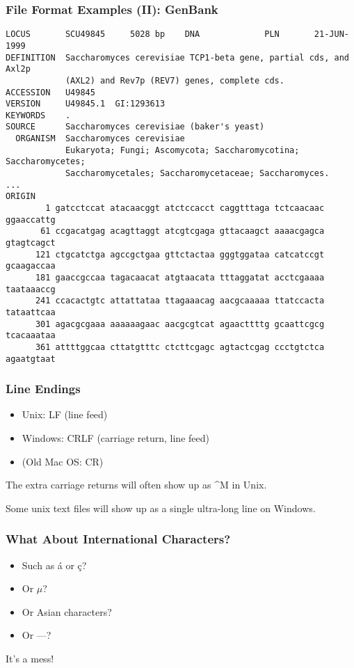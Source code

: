 \begin{frame}[fragile]
\frametitle{File Format Examples (II): GenBank}

\begin{verbatim}
LOCUS       SCU49845     5028 bp    DNA             PLN       21-JUN-1999
DEFINITION  Saccharomyces cerevisiae TCP1-beta gene, partial cds, and Axl2p
            (AXL2) and Rev7p (REV7) genes, complete cds.
ACCESSION   U49845
VERSION     U49845.1  GI:1293613
KEYWORDS    .
SOURCE      Saccharomyces cerevisiae (baker's yeast)
  ORGANISM  Saccharomyces cerevisiae
            Eukaryota; Fungi; Ascomycota; Saccharomycotina; Saccharomycetes;
            Saccharomycetales; Saccharomycetaceae; Saccharomyces.
...
ORIGIN
        1 gatcctccat atacaacggt atctccacct caggtttaga tctcaacaac ggaaccattg
       61 ccgacatgag acagttaggt atcgtcgaga gttacaagct aaaacgagca gtagtcagct
      121 ctgcatctga agccgctgaa gttctactaa gggtggataa catcatccgt gcaagaccaa
      181 gaaccgccaa tagacaacat atgtaacata tttaggatat acctcgaaaa taataaaccg
      241 ccacactgtc attattataa ttagaaacag aacgcaaaaa ttatccacta tataattcaa
      301 agacgcgaaa aaaaaagaac aacgcgtcat agaacttttg gcaattcgcg tcacaaataa
      361 attttggcaa cttatgtttc ctcttcgagc agtactcgag ccctgtctca agaatgtaat
\end{verbatim}
\end{frame}

\begin{frame}[fragile]
\frametitle{Line Endings}
\begin{itemize}
\item Unix: LF (line feed)
\item Windows: CRLF (carriage return, line feed)
\item (Old Mac OS: CR)
\end{itemize}

The extra carriage returns will often show up as \^{}M in Unix.

Some unix text files will show up as a single ultra-long line on Windows.

\end{frame}


\begin{frame}[fragile]
\frametitle{What About International Characters?}

\begin{itemize}
\item Such as \'{a} or \c{c}?
\item Or $\mu$?
\item Or Asian characters?
\item Or ---?

\end{itemize}
It's a mess!
\end{frame}

